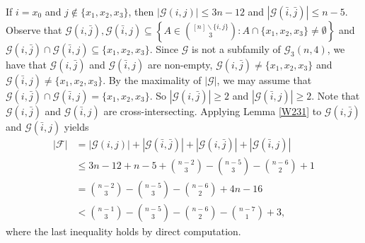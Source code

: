 \documentclass[11pt]{article}
\numberwithin{equation}{section}
\begin{document}
If $i=x_0$ and $j\notin \{x_1, x_2, x_3\}$, then $|\mathcal{G}(i,j)|\leq 3n-12$ and  $|\mathcal{G}(\bar{i},\bar{j})|\leq n-5$. Observe that  $\mathcal{G}(i,\bar{j}), \mathcal{G}(\bar{i},j) \subseteq\left\{A \in\binom{[n]\backslash \{i,j\}}{3}:  A\cap \{x_1, x_2, x_3\}\neq \emptyset\right\}$ and $\mathcal{G}(i,\bar{j})\cap \mathcal{G}(\bar{i},j)\subseteq \{x_1,x_2,x_3\}$. Since $\mathcal{G}$ is not a subfamily of $\mathcal{G}_3(n, 4)$, we have that $\mathcal{G}(i,\bar{j})$ and
$\mathcal{G}(\bar{i},j)$ are non-empty, $\mathcal{G}(i,\bar{j})\neq \{x_1, x_2, x_3\}$ and $\mathcal{G}(\bar{i},j)\neq  \{x_1, x_2, x_3\}$.
 By the maximality of $|\mathcal{G}|$, we may assume that $\mathcal{G}(i,\bar{j})\cap \mathcal{G}(\bar{i},j)=\{x_1, x_2, x_3\}$. So  $|\mathcal{G}(i,\bar{j})|\geq 2$ and $|\mathcal{G}(\bar{i},j)|\geq 2$.
Note that $\mathcal{G}(i,\bar{j})$ and $\mathcal{G}(\bar{i},j)$ are 
cross-intersecting.
 Applying Lemma \ref{W231} to $\mathcal{G}(i,\bar{j})$ and $\mathcal{G}(\bar{i},j)$ yields
\begin{align*}
|\mathcal{F}|&=|\mathcal{G}(i,j)|+|\mathcal{G}(\bar{i},\bar{j})|+|\mathcal{G}(i,\bar{j})|+|\mathcal{G}(\bar{i}, j)|\\
&\leq 3n-12+n-5+\binom{n-2}{3}- \binom{n-5}{3}-\binom{n-6}{2}+1\\
&=\binom{n-2}{3}- \binom{n-5}{3}-\binom{n-6}{2}+4n-16 \\
&< \binom{n-1}{3}-\binom{n-5}{3}-\binom{n-6}{2}-\binom{n-7}{1}+3, 
\end{align*}
where the last inequality holds by direct computation. 
\end{document}
